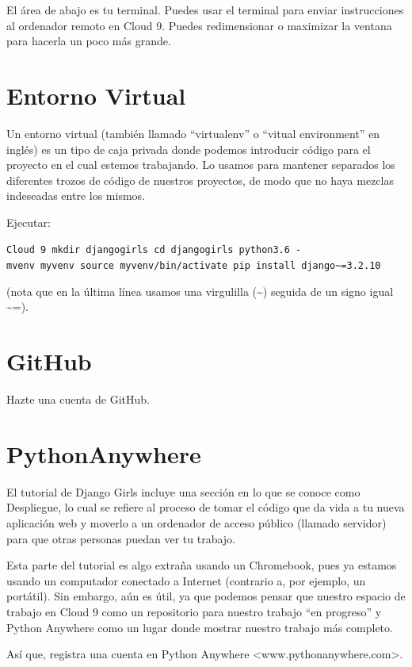 \documentclass[
  a4paper,
  DIV=11,
  numbers=noendperiod,
  onepage,
  openany]{scrreprt}
\begin{document}
\begin{tcolorbox}
El área de abajo es tu terminal. Puedes usar el terminal para enviar
instrucciones al ordenador remoto en Cloud 9. Puedes redimensionar o
maximizar la ventana para hacerla un poco más grande.

\section{Entorno Virtual}\label{entorno-virtual}

Un entorno virtual (también llamado ``virtualenv'' o ``vitual
environment'' en inglés) es un tipo de caja privada donde podemos
introducir código para el proyecto en el cual estemos trabajando. Lo
usamos para mantener separados los diferentes trozos de código de
nuestros proyectos, de modo que no haya mezclas indeseadas entre los
mismos.

Ejecutar:

\texttt{Cloud\ 9\ mkdir\ djangogirls\ cd\ djangogirls\ python3.6\ -mvenv\ myvenv\ source\ myvenv/bin/activate\ pip\ install\ django\textasciitilde{}=3.2.10}

(nota que en la última línea usamos una virgulilla (\textasciitilde)
seguida de un signo igual \textasciitilde=).

\section{GitHub}\label{github}

Hazte una cuenta de GitHub.

\section{PythonAnywhere}\label{pythonanywhere}

El tutorial de Django Girls incluye una sección en lo que se conoce como
Despliegue, lo cual se refiere al proceso de tomar el código que da vida
a tu nueva aplicación web y moverlo a un ordenador de acceso público
(llamado servidor) para que otras personas puedan ver tu trabajo.

Esta parte del tutorial es algo extraña usando un Chromebook, pues ya
estamos usando un computador conectado a Internet (contrario a, por
ejemplo, un portátil). Sin embargo, aún es útil, ya que podemos pensar
que nuestro espacio de trabajo en Cloud 9 como un repositorio para
nuestro trabajo ``en progreso'' y Python Anywhere como un lugar donde
mostrar nuestro trabajo más completo.

Así que, registra una cuenta en Python Anywhere
\textless www.pythonanywhere.com\textgreater.

\end{tcolorbox}
\end{document}

